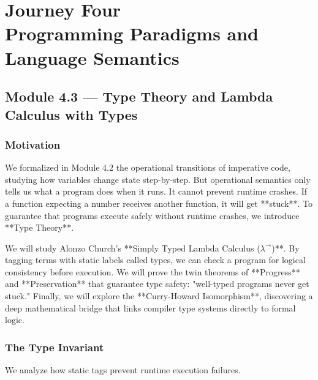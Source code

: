 \documentclass[12pt, a4paper]{book}
\begin{document}
\setcounter{chapter}{3}
\chapter[Journey 4 --- Programming Paradigms and Language Semantics]
        {Journey Four\\[8pt]
         \textcolor{ModuleColor}{\large Programming Paradigms and Language Semantics}}
\setcounter{section}{2}

\section{Module 4.3 --- Type Theory and Lambda Calculus with Types}
\label{sec:mod4.3}

\subsection*{Motivation}

We formalized in Module 4.2 the operational transitions of imperative code, studying how variables change state step-by-step.
But operational semantics only tells us what a program does when it runs. It cannot prevent runtime crashes.
If a function expecting a number receives another function, it will get **stuck**.
To guarantee that programs execute safely without runtime crashes, we introduce **Type Theory**.

We will study Alonzo Church's **Simply Typed Lambda Calculus ($\lambda^\to$)**.
By tagging terms with static labels called types, we can check a program for logical consistency before execution.
We will prove the twin theorems of **Progress** and **Preservation** that guarantee type safety: "well-typed programs never get stuck."
Finally, we will explore the **Curry-Howard Isomorphism**, discovering a deep mathematical bridge that links compiler type systems directly to formal logic.

\subsection{The Type Invariant}

We analyze how static tags prevent runtime execution failures.
\end{document}
